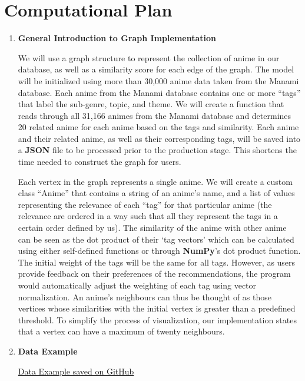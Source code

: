 \documentclass[fontsize=11pt]{article}
\begin{document}
\section*{Computational Plan}

\begin{enumerate}
    \item \textbf{General Introduction to Graph Implementation}
    
    \quad We will use a graph structure to represent the collection of anime in our database, as well as a similarity score for each edge of the graph. The model will be initialized using more than 30,000 anime data taken from the Manami database. Each anime from the Manami database contains one or more “tags” that label the sub-genre, topic, and theme. We will create a function that reads through all 31,166 animes from the Manami database and determines 20 related anime for each anime based on the tags and similarity. Each anime and their related anime, as well as their corresponding tags, will be saved into a \textbf{JSON} file to be processed prior to the production stage. This shortens the time needed to construct the graph for users.
    
    \quad Each vertex in the graph represents a single anime. We will create a custom class “Anime” that contains a string of an anime’s name, and a list of values representing the relevance of each “tag” for that particular anime (the relevance are ordered in a way such that all they represent the tags in a certain order defined by us). The similarity of the anime with other anime can be seen as the dot product of their ‘tag vectors’ which can be calculated using either self-defined functions or through \textbf{\textbf{NumPy}}’s dot product function. The initial weight of the tags will be the same for all tags. However, as users provide feedback on their preferences of the recommendations, the program would automatically adjust the weighting of each tag using vector normalization. An anime’s neighbours can thus be thought of as those vertices whose similarities with the initial vertex is greater than a predefined threshold. To simplify the process of visualization, our implementation states that a vertex can have a maximum of twenty neighbours.
    
    \item \textbf{Data Example}
    
    \href{https://gist.github.com/RealFakeAccount/cf34244d17039e78512428a1cf51d95f}{Data Example saved on GitHub} \citep{manami}
    

\end{enumerate}
\end{document}
